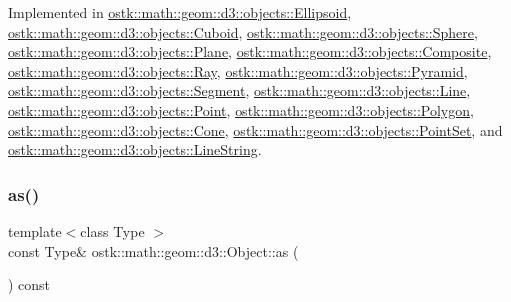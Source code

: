 Implemented in \hyperlink{classostk_1_1math_1_1geom_1_1d3_1_1objects_1_1_ellipsoid_aa7c60b942f6b1fa3a513bc3b549ab9e6}{ostk\+::math\+::geom\+::d3\+::objects\+::\+Ellipsoid}, \hyperlink{classostk_1_1math_1_1geom_1_1d3_1_1objects_1_1_cuboid_aaa90106ccf8120f854bdcf0f824e5610}{ostk\+::math\+::geom\+::d3\+::objects\+::\+Cuboid}, \hyperlink{classostk_1_1math_1_1geom_1_1d3_1_1objects_1_1_sphere_a421357bf4058e68e0aa636f606c6b249}{ostk\+::math\+::geom\+::d3\+::objects\+::\+Sphere}, \hyperlink{classostk_1_1math_1_1geom_1_1d3_1_1objects_1_1_plane_a4d96743e35df811f8c725561d353e245}{ostk\+::math\+::geom\+::d3\+::objects\+::\+Plane}, \hyperlink{classostk_1_1math_1_1geom_1_1d3_1_1objects_1_1_composite_a2d99d6b4096c2f5ba3175f886e2e2c7d}{ostk\+::math\+::geom\+::d3\+::objects\+::\+Composite}, \hyperlink{classostk_1_1math_1_1geom_1_1d3_1_1objects_1_1_ray_abdbc52aa6745f9d9601a8138a519d828}{ostk\+::math\+::geom\+::d3\+::objects\+::\+Ray}, \hyperlink{classostk_1_1math_1_1geom_1_1d3_1_1objects_1_1_pyramid_ab4f31049019c0ea4b87931adf4ba7c5d}{ostk\+::math\+::geom\+::d3\+::objects\+::\+Pyramid}, \hyperlink{classostk_1_1math_1_1geom_1_1d3_1_1objects_1_1_segment_a5d2aba754d42c89224c7579944de9c4f}{ostk\+::math\+::geom\+::d3\+::objects\+::\+Segment}, \hyperlink{classostk_1_1math_1_1geom_1_1d3_1_1objects_1_1_line_ab12eb788b966601d6d09f75196a30d6f}{ostk\+::math\+::geom\+::d3\+::objects\+::\+Line}, \hyperlink{classostk_1_1math_1_1geom_1_1d3_1_1objects_1_1_point_a0b79a5726ac04f814b8a5b737daf0028}{ostk\+::math\+::geom\+::d3\+::objects\+::\+Point}, \hyperlink{classostk_1_1math_1_1geom_1_1d3_1_1objects_1_1_polygon_abf60fe8602485822f8f07c01f6980cf5}{ostk\+::math\+::geom\+::d3\+::objects\+::\+Polygon}, \hyperlink{classostk_1_1math_1_1geom_1_1d3_1_1objects_1_1_cone_a9b783e16344d65dfba68c63d1adca3e1}{ostk\+::math\+::geom\+::d3\+::objects\+::\+Cone}, \hyperlink{classostk_1_1math_1_1geom_1_1d3_1_1objects_1_1_point_set_af03e071aa9d7a364a0c76f563b65a57e}{ostk\+::math\+::geom\+::d3\+::objects\+::\+Point\+Set}, and \hyperlink{classostk_1_1math_1_1geom_1_1d3_1_1objects_1_1_line_string_a8d1b47e4f9e314a5fc7df353c808dbc2}{ostk\+::math\+::geom\+::d3\+::objects\+::\+Line\+String}.

\mbox{\label{classostk_1_1math_1_1geom_1_1d3_1_1_object_ad921120c3bf1176035258fad0f654137}} 
\subsubsection{\texorpdfstring{as()}{as()}}
{\footnotesize\ttfamily template$<$class Type $>$ \\
const Type\& ostk\+::math\+::geom\+::d3\+::\+Object\+::as (\begin{DoxyParamCaption}{ }\end{DoxyParamCaption}) const\hspace{0.3cm}{\ttfamily [inline]}}



